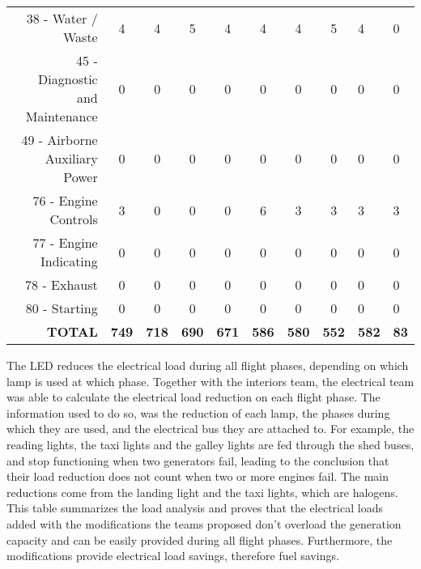 \begin{table}[htbp]
\begin{tabular}{rcccccccp{2cm}p{2cm}}
    38 - Water / Waste & 4     & 4     & 5     & 4     & 4     & 4     & 5     & 4     & 0 \\
    45 - Diagnostic and Maintenance & 0     & 0     & 0     & 0     & 0     & 0     & 0     & 0     & 0 \\
    49 - Airborne Auxiliary Power & 0     & 0     & 0     & 0     & 0     & 0     & 0     & 0     & 0 \\
    76 - Engine Controls & 3     & 0     & 0     & 0     & 6     & 3     & 3     & 3     & 3 \\
    77 - Engine Indicating & 0     & 0     & 0     & 0     & 0     & 0     & 0     & 0     & 0 \\
    78 - Exhaust & 0     & 0     & 0     & 0     & 0     & 0     & 0     & 0     & 0 \\
    80 - Starting & 0     & 0     & 0     & 0     & 0     & 0     & 0     & 0     & 0 \\
    \textbf{TOTAL} & \textbf{749} & \textbf{718} & \textbf{690} & \textbf{671} & \textbf{586} & \textbf{580} & \textbf{552} & \textbf{582} & \textbf{83} \\
    \bottomrule
    \end{tabular}%
  \label{tab:NewEleLoads}%
\end{table}%

The LED reduces the electrical load during all flight phases, depending on which lamp is used at which phase. Together with the interiors team, the electrical team was able to calculate the electrical load reduction on each flight phase. The information used to do so, was the reduction of each lamp, the phases during which they are used, and the electrical bus they are attached to. For example, the reading lights, the taxi lights and the galley lights are fed through the shed buses, and stop functioning when two generators fail, leading to the conclusion that their load reduction does not count when two or more engines fail. The main reductions come from the landing light and the taxi lights, which are halogens.
This table summarizes the load analysis and proves that the electrical loads added with the modifications the teams proposed don't overload the generation capacity and can be easily provided during all flight phases. Furthermore, the modifications provide electrical load savings, therefore fuel savings.

